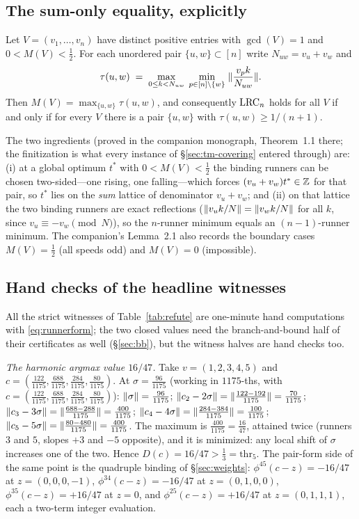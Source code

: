 \subsection{The sum-only equality, explicitly}

\begin{theorem}\label{si:thm:equality-explicit}
Let $V=(v_1,\dots,v_n)$ have distinct positive entries with $\gcd(V)=1$
and $0<M(V)<\tfrac12$. For each unordered pair $\{u,w\}\subset[n]$ write
$N_{uw}=v_u+v_w$ and
\[
\tau(u,w)\;=\;\max_{0\le k<N_{uw}}\;\min_{p\in[n]\setminus\{w\}}\;
\lVert \frac{v_pk}{N_{uw}} \rVert.
\]
Then $M(V)=\max_{\{u,w\}}\tau(u,w)$, and consequently $\mathrm{LRC}_n$ holds
for all $V$ if and only if for every $V$ there is a pair $\{u,w\}$ with
$\tau(u,w)\ge 1/(n+1)$.
\end{theorem}

The two ingredients (proved in the companion monograph, Theorem~1.1
there; the finitization is what every instance of \S\ref{sec:tm-covering}
entered through) are: (i) at a global optimum $t^\ast$ with
$0<M(V)<\tfrac12$ the binding runners can be chosen two-sided---one
rising, one falling---which forces $(v_u+v_w)t^\ast\in\mathbb{Z}$ for that pair,
so $t^\ast$ lies on the \emph{sum} lattice of denominator $v_u+v_w$; and
(ii) on that lattice the two binding runners are exact reflections
($\lVert v_uk/N \rVert=\lVert v_wk/N \rVert$ for all $k$, since $v_u\equiv-v_w \pmod N$),
so the $n$-runner minimum equals an $(n-1)$-runner minimum. The
companion's Lemma~2.1 also records the boundary cases $M(V)=\tfrac12$
(all speeds odd) and $M(V)=0$ (impossible).

\subsection{Hand checks of the headline witnesses}

All the strict witnesses of Table~\ref{tab:refute} are one-minute hand
computations with \eqref{eq:runnerform}; the two closed values need the
branch-and-bound half of their certificates as well
(\S\ref{sec:bb}), but the witness halves are hand checks too.

\emph{The harmonic argmax value $16/47$.} Take $v=(1,2,3,4,5)$ and
$c=(\tfrac{122}{1175},\tfrac{688}{1175},\tfrac{284}{1175},
\tfrac{80}{1175})$. At $\sigma=\tfrac{96}{1175}$ (working in
$1175$-ths, with $c=(\tfrac{122}{1175},\tfrac{688}{1175},
\tfrac{284}{1175},\tfrac{80}{1175})$):
$\lVert \sigma \rVert=\tfrac{96}{1175}$;
$\lVert c_2-2\sigma \rVert=\lVert \tfrac{122-192}{1175} \rVert=\tfrac{70}{1175}$;
$\lVert c_3-3\sigma \rVert=\lVert \tfrac{688-288}{1175} \rVert=\tfrac{400}{1175}$;
$\lVert c_4-4\sigma \rVert=\lVert \tfrac{284-384}{1175} \rVert=\tfrac{100}{1175}$;
$\lVert c_5-5\sigma \rVert=\lVert \tfrac{80-480}{1175} \rVert=\tfrac{400}{1175}$.
The maximum is $\tfrac{400}{1175}=\tfrac{16}{47}$, attained twice
(runners $3$ and $5$, slopes $+3$ and $-5$ opposite), and it is
minimized: any local shift of $\sigma$ increases one of the two. Hence
$D(c)=16/47>\tfrac13=\mathrm{thr}_5$. The pair-form side of the same
point is the quadruple binding of \S\ref{sec:weights}:
$\phi^{45}(c-z)=-16/47$ at $z=(0,0,0,-1)$, $\phi^{34}(c-z)=-16/47$ at
$z=(0,1,0,0)$, $\phi^{35}(c-z)=+16/47$ at $z=0$, and
$\phi^{25}(c-z)=+16/47$ at $z=(0,1,1,1)$, each a two-term integer
evaluation.

